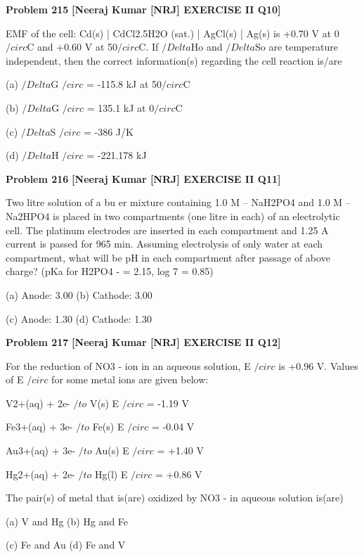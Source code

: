 \begin{problembox}
\textbf{Problem 215} \hfill \textbf{[Neeraj Kumar [NRJ] EXERCISE II Q10]}
\label{q:ext-nrj_all_questions-215}

EMF of the cell: Cd(s) | CdCl2.5H2O (sat.) | AgCl(s) 
| Ag(s) is +0.70 V at 0$/circ$C and +0.60 V at 50$/circ$C. If 
$/Delta$Ho and $/Delta$So are temperature independent, then 
the correct information(s) regarding the cell 
reaction is/are
 
 (a) $/Delta$G $/circ$ = -115.8 kJ at 50$/circ$C
 
 (b) $/Delta$G $/circ$ = 135.1 kJ at 0$/circ$C
 
 (c) $/Delta$S $/circ$ = -386 J/K
 
 (d) $/Delta$H $/circ$ = -221.178 kJ
\end{problembox}

\begin{problembox}
\textbf{Problem 216} \hfill \textbf{[Neeraj Kumar [NRJ] EXERCISE II Q11]}
\label{q:ext-nrj_all_questions-216}

Two litre solution of a bu  er mixture containing 
1.0 M -- NaH2PO4 and 1.0 M -- Na2HPO4 is 
placed in two compartments (one litre in each) of 
an electrolytic cell. The platinum electrodes are 
inserted in each compartment and 1.25 A current 
is passed for 965 min. Assuming electrolysis of 
only water at each compartment, what will be 
pH in each compartment after passage of above 
charge? (pKa for H2PO4
- = 2.15, log 7 = 0.85)
 
 (a) Anode: 3.00 
(b) Cathode: 3.00
 
 (c) Anode: 1.30 
(d) Cathode: 1.30
\end{problembox}

\begin{problembox}
\textbf{Problem 217} \hfill \textbf{[Neeraj Kumar [NRJ] EXERCISE II Q12]}
\label{q:ext-nrj_all_questions-217}

For the reduction of NO3
- ion in an aqueous 
solution, E $/circ$ is +0.96 V. Values of E $/circ$ for some 
metal ions are given below:
 
  V2+(aq) + 2e- $/to$ V(s) 
E $/circ$ = -1.19 V
 
  Fe3+(aq) + 3e- $/to$ Fe(s) 
E $/circ$ = -0.04 V
 
  Au3+(aq) + 3e- $/to$ Au(s) E $/circ$ = +1.40 V
 
  Hg2+(aq) + 2e- $/to$ Hg(l) E $/circ$ = +0.86 V
 
 The pair(s) of metal that is(are) oxidized by NO3
- 
in aqueous solution is(are)
 
 (a) V and Hg 
(b) Hg and Fe
 
 (c) Fe and Au 
(d) Fe and V
\end{problembox}


